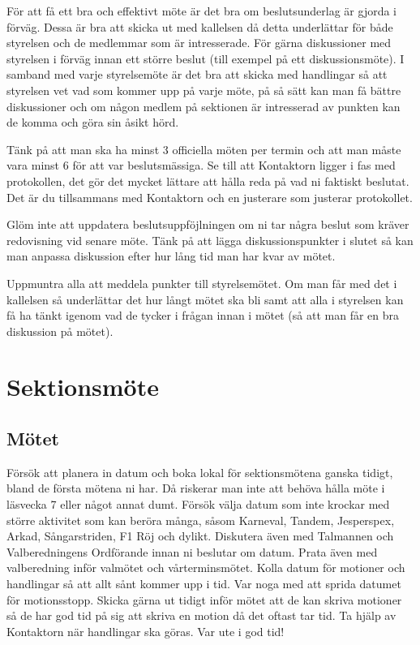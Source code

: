 \documentclass[10pt]{article}
\begin{document}
    För att få ett bra och effektivt möte är det bra om beslutsunderlag är gjorda i förväg. Dessa är bra att skicka ut med kallelsen då detta underlättar för både styrelsen och de medlemmar som är intresserade. För gärna diskussioner med styrelsen i förväg innan ett större beslut (till exempel på ett diskussionsmöte). I samband med varje styrelsemöte är det bra att skicka med handlingar så att styrelsen vet vad som kommer upp på varje möte, på så sätt kan man få bättre diskussioner och om någon medlem på sektionen är intresserad av punkten kan de komma och göra sin åsikt hörd.
    
    Tänk på att man ska ha minst 3 officiella möten per termin och att man måste vara minst 6 för att var beslutsmässiga. Se till att Kontaktorn ligger i fas med protokollen, det gör det mycket lättare att hålla reda på vad ni faktiskt beslutat. Det är du tillsammans med Kontaktorn och en justerare som justerar protokollet.
    
    Glöm inte att uppdatera beslutsuppföjlningen om ni tar några beslut som kräver redovisning vid senare möte. Tänk på att lägga diskussionspunkter i slutet så kan man anpassa diskussion efter hur lång tid man har kvar av mötet.
    
    Uppmuntra alla att meddela punkter till styrelsemötet. Om man får med det i kallelsen så underlättar det hur långt mötet ska bli samt att alla i styrelsen kan få ha tänkt igenom vad de tycker i frågan innan i mötet (så att man får en bra diskussion på mötet).
    
    \section{Sektionsmöte}
    
    \subsection{Mötet}
    
    Försök att planera in datum och boka lokal för sektionsmötena ganska tidigt, bland de första mötena ni har. Då riskerar man inte att behöva hålla möte i läsvecka 7 eller något annat dumt. Försök välja datum som inte krockar med större aktivitet som kan beröra många, såsom Karneval, Tandem, Jesperspex, Arkad, Sångarstriden, F1 Röj och dylikt. Diskutera även med Talmannen och Valberedningens Ordförande innan ni beslutar om datum. Prata även med valberedning inför valmötet och vårterminsmötet. Kolla datum för motioner och handlingar så att allt sånt kommer upp i tid. Var noga med att sprida datumet för motionsstopp. Skicka gärna ut tidigt inför mötet att de kan skriva motioner så de har god tid på sig att skriva en motion då det oftast tar tid. Ta hjälp av Kontaktorn när handlingar ska göras. Var ute i god tid!
    
\end{document}
